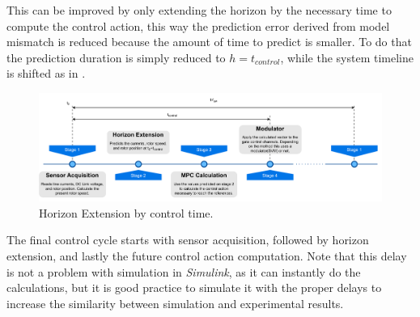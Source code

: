 This can be improved by only extending the horizon by the necessary time to compute the control action, this way the prediction error derived from model mismatch is reduced because the amount of time to predict is smaller. To do that the prediction duration is simply reduced to $h = t_{control}$, while the system timeline is shifted as in . 


\begin{figure}[!htb]
	\centering
	\includegraphics[width=1\textwidth]{Figures/Horizon Extension Timeline.pdf}
	\caption[Horizon Extension by control time.]{Horizon Extension by control time.}
	\label{fig:horizon_extend_timeline} %
\end{figure}

The final control cycle starts with sensor acquisition, followed by horizon extension, and lastly the future control action computation. Note that this delay is not a problem with simulation in \textit{Simulink}, as it can instantly do the calculations, but it is good practice to simulate it with the proper delays to increase the similarity between simulation and experimental results.

